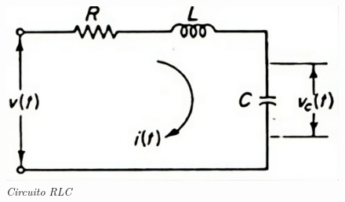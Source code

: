 \documentclass[12pt,a4paper]{report}
\begin{document}
  \vspace{-1cm}
  \noindent
  \begin{figure}[h]
    \centering
    \begin{minipage}[h]{0.5\textwidth}
      \centering
      \includegraphics[width=1\textwidth]{./images/ej4.5.jpeg}
      \textit{Circuito RLC}
    \end{minipage}
  \end{figure}
\end{document}
